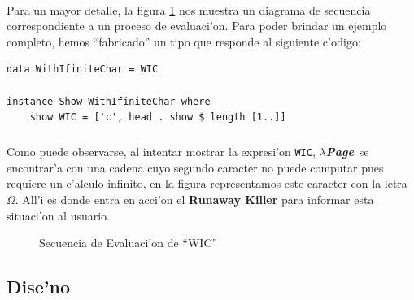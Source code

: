 \documentclass[a4paper]{article}
\newcommand{\hpage}{\textbf{\textsl{$\lambda$Page}}}
\begin{document}
\paragraph{}Para un mayor detalle, la figura \ref{seq1} nos muestra un diagrama de secuencia correspondiente a un proceso de evaluaci'on.  Para poder brindar un ejemplo completo, hemos ``fabricado'' un tipo que responde al siguiente c'odigo:
\lstset{language=haskell, frame=single, tabsize=4}
\begin{center}\begin{lstlisting}
data WithIfiniteChar = WIC

instance Show WithIfiniteChar where
    show WIC = ['c', head . show $ length [1..]]
\end{lstlisting}\end{center}
\subparagraph{}Como puede observarse, al intentar mostrar la expresi'on \texttt{WIC}, \hpage\ se encontrar'a con una cadena cuyo segundo caracter no puede computar pues requiere un c'alculo infinito, en la figura representamos este caracter con la letra $\Omega$.  All'i es donde entra en acci'on el \textbf{Runaway Killer} para informar esta situaci'on al usuario.
\begin{figure}[hp]
	\begin{center}
		\caption{Secuencia de Evaluaci'on de ``WIC''}
		\label{seq1}
	\end{center}
\end{figure}

\newpage
\subsection{Dise'no}
\begin{epigraphs}
\end{epigraphs}
\end{document}
